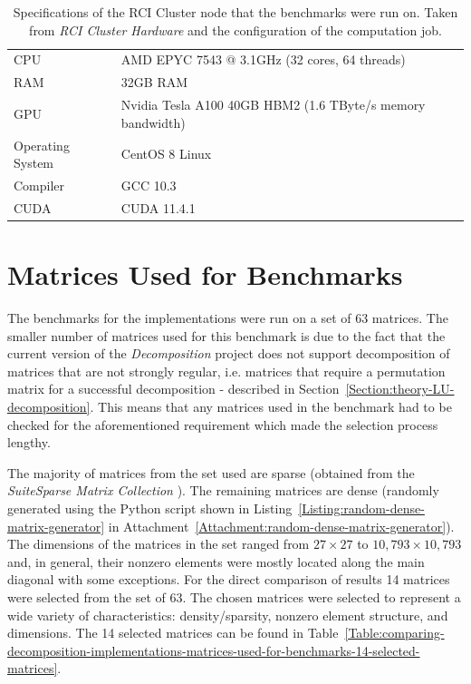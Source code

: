 \begin{table}[ht!]
	\centering
	\begin{tabular}{|l|l|}
		\hline
		CPU              & AMD EPYC 7543 @ 3.1GHz (32 cores, 64 threads) \\
		RAM              & 32GB RAM \\
		GPU              & Nvidia Tesla A100 40GB HBM2 (1.6 TByte/s memory bandwidth) \\
		Operating System & CentOS 8 Linux \\
		Compiler         & GCC 10.3 \\
		CUDA             & CUDA 11.4.1 \\ \hline
	\end{tabular}
	\caption{Specifications of the  RCI Cluster node that the benchmarks were run on. Taken from \emph{RCI Cluster Hardware} \cite{VVJW5lCpZRWyg8xc} and the configuration of the computation job.}
	\label{Table:comparing-decomposition-implementations-benchmark-platform-specifications}
\end{table}



\section{Matrices Used for Benchmarks \TO}
The benchmarks for the implementations were run on a set of 63 matrices. The smaller number of matrices used for this benchmark is due to the fact that the current version of the \textit{Decomposition} project does not support decomposition of matrices that are not strongly regular, i.e. matrices that require a permutation matrix for a successful decomposition - described in Section~\ref{Section:theory-LU-decomposition}. This means that any matrices used in the benchmark had to be checked for the aforementioned requirement which made the selection process lengthy.
\par The majority of matrices from the set used are sparse (obtained from the \emph{SuiteSparse Matrix Collection} \cite{Davis2011}). The remaining matrices are dense (randomly generated using the Python script shown in Listing~\ref{Listing:random-dense-matrix-generator} in Attachment~\ref{Attachment:random-dense-matrix-generator}). The dimensions of the matrices in the set ranged from $ 27 \times 27 $ to $ 10,793 \times 10,793 $ and, in general, their nonzero elements were mostly located along the main diagonal with some exceptions. For the direct comparison of results 14 matrices were selected from the set of 63. The chosen matrices were selected to represent a wide variety of characteristics: density/sparsity, nonzero element structure, and dimensions. The 14 selected matrices can be found in Table~\ref{Table:comparing-decomposition-implementations-matrices-used-for-benchmarks-14-selected-matrices}.

